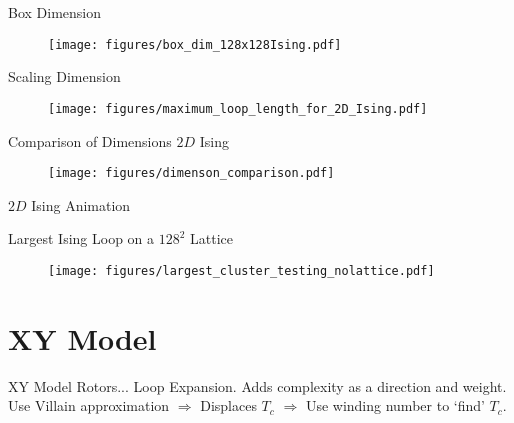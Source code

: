 \documentclass[10pt]{beamer}
\begin{document}
\begin{frame}{Box Dimension}
    \begin{figure}[h!]
        \centering
            \texttt{[image: figures/box\_dim\_128x128Ising.pdf]}
    \end{figure}
\end{frame}

\begin{frame}{Scaling Dimension}
    \begin{figure}[h!]
        \centering
            \texttt{[image: figures/maximum\_loop\_length\_for\_2D\_Ising.pdf]}
    \end{figure}
\end{frame}

\begin{frame}{Comparison of Dimensions $2D$ Ising}
    \begin{figure}[h!]
        \centering
            \texttt{[image: figures/dimenson\_comparison.pdf]}
    \end{figure}
\end{frame}


\begin{frame}{$2D$ Ising Animation}
\end{frame}

\begin{frame}{Largest Ising Loop on a $128^2$ Lattice}
    \begin{figure}[h!]
        \centering
            \texttt{[image: figures/largest\_cluster\_testing\_nolattice.pdf]}
    \end{figure}
\end{frame}

\section{XY Model}

\begin{frame}{XY Model}
    Rotors... Loop Expansion. Adds complexity as a direction and weight. Use Villain approximation $\Rightarrow$ Displaces $T_c$ $\Rightarrow$ Use winding number to `find' $T_c$.
\end{frame}
\end{document}
